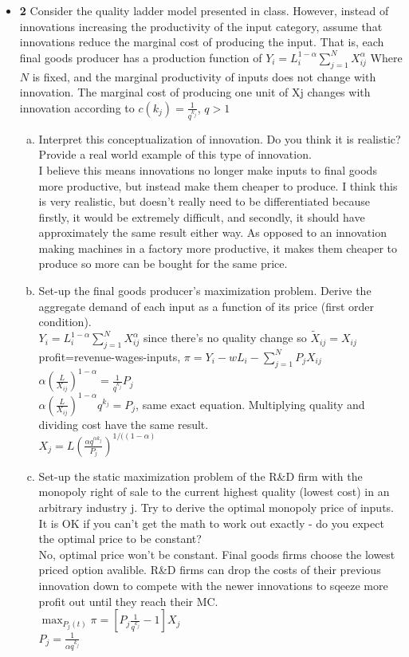 \documentclass[11pt]{article}
\begin{document}
\begin{itemize}
\vspace{0.2in}

\item \textbf{2} 
Consider the quality ladder model presented in class. However, instead of innovations increasing the productivity of the input category, assume that innovations reduce the marginal cost of producing the input. That is, each final goods producer has a production function of $Y_i=L_i^{1-\alpha}\sum_{j=1}^NX_{ij}^\alpha$ Where $N$ is fixed, and the marginal productivity of inputs does not change with innovation. The marginal cost of producing one unit of Xj changes with innovation
according to $c(k_j)=\frac{1}{q^{k_j}}$, $q>1$
\begin{enumerate}[(a)]
\item Interpret this conceptualization of innovation. Do you think it is realistic? Provide a real world example of this type of innovation.
\\I believe this means innovations no longer make inputs to final goods more productive, but instead make them cheaper to produce. I think this is very realistic, but doesn't really need to be differentiated because firstly, it would be extremely difficult, and secondly, it should have approximately the same result either way. As opposed to an innovation making machines in a factory more productive, it makes them cheaper to produce so more can be bought for the same price.
\item Set-up the final goods producer's maximization problem. Derive the aggregate demand of each input as a function of its price (first order condition).
\\$Y_i=L_i^{1-\alpha}\sum_{j=1}^NX_{ij}^\alpha$ since there's no quality change so $\tilde X_{ij} = X_{ij}$
\\profit=revenue-wages-inputs, $\pi=Y_i-wL_i-\sum_{j=1}^NP_jX_{ij}$
\\$\alpha(\frac{L}{X_{ij}})^{1-\alpha}=\frac{1}{q^{k_j}} P_j$
\\$\alpha(\frac{L}{X_{ij}})^{1-\alpha}q^{k_j}= P_j$, same exact equation. Multiplying quality and dividing cost have the same result.
\\$X_j=L(\frac{\alpha q^{\alpha k_j}}{P_j})^{1/((1-\alpha)}$
\item Set-up the static maximization problem of the R\&D firm with the monopoly right of sale to the current highest quality (lowest cost) in an arbitrary industry j. Try to derive the optimal monopoly price of inputs. It is OK if you can't get the math to work out exactly - do you expect the optimal price to be constant?
\\No, optimal price won't be constant. Final goods firms choose the lowest priced option avalible. R\&D firms can drop the costs of their previous innovation down to compete with the newer innovations to sqeeze more profit out until they reach their MC.
\\$\max_{P_j(t)}\pi = [P_j \frac{1}{q^{k_j}} -1]X_j$
\\$P_j=\frac{1}{\alpha q^{k_j}}$
\end{enumerate}

\vspace{0.2in}

\end{itemize}
\end{document}

